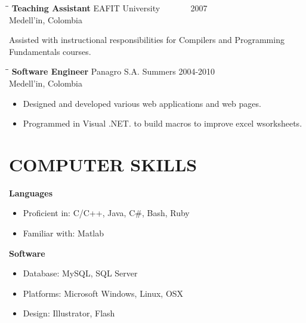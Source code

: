 \documentclass{res}
\begin{document}
\begin{resume}
   \begin{tabbing}
   \hspace{2.3in}\= \hspace{2.6in}\= \kill %
    {\bf Teaching Assistant} \>EAFIT University\> ~~~~~~ 2007\\
                          \>Medell\a'in, Colombia
   \end{tabbing}\vspace{-5pt}
    Assisted with instructional responsibilities for Compilers and Programming Fundamentals courses.
   \begin{tabbing}%
   \hspace{2.3in}\= \hspace{2.6in}\= \kill %
   {\bf Software Engineer}\> Panagro S.A.\> Summers  2004-2010\\
                          \>Medell\a'in, Colombia
   \end{tabbing}\vspace{-5pt}
   \begin{itemize}
        \item Designed and developed various web applications and web pages.  
        \item Programmed in Visual .NET. to build macros to improve excel wsorksheets.
   \end{itemize}

\section{COMPUTER SKILLS}
	\vspace{0.05 in}	

    \textbf{Languages}\\
	\vspace{-0.1 in}	
    \begin{itemize}
    	\item Proficient in: C/C++, Java, C\#, Bash, Ruby
    	\item Familiar with: Matlab
    \end{itemize}

	\textbf{Software}
	\begin{itemize}
		\item Database: MySQL, SQL Server
		\item Platforms: Microsoft Windows, Linux, OSX
		\item Design: Illustrator, Flash
	\end{itemize} 


\end{resume}
\end{document}
